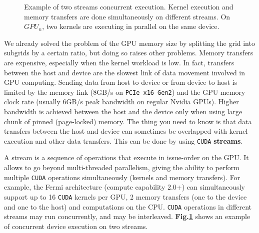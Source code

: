 \documentclass[12pt,journal,compsoc]{IEEEtran}
\begin{document}
\begin{figure}[!ht]
\centering
{}
\caption{Example of two streams concurrent execution. Kernel execution and memory transfers are done simultaneously on different streams. On $GPU_n$, two kernels are executing in parallel on the same device.}
\label{basic_streams}
\end{figure}


We already solved the problem of the GPU memory size by splitting the grid into subgrids by a certain ratio, but doing so raises other problems.
Memory transfers are expensive, especially when the kernel workload is low.
In fact, transfers between the host and device are the slowest link of data movement involved in GPU computing.
Sending data from host to device or from device to host is limited by the memory link (8GB/s on \texttt{PCIe x16 Gen2}) and the GPU memory clock rate (usually 6GB/s peak bandwidth on regular Nvidia GPUs).
Higher bandwidth is achieved between the host and the device only when using large chunk of pinned (page-locked) memory.
The thing you need to know is that data transfers between the host and device can sometimes be overlapped with kernel execution and other data transfers.
This can be done by using \texttt{CUDA} \textbf{streams}.\par
A stream is a sequence of operations that execute in issue-order on the GPU.
It allows to go beyond multi-threaded parallelism, giving the ability to perform multiple \texttt{CUDA} operations simultaneously (kernels and memory transfers).
For example, the Fermi architecture (compute capability 2.0+) can simultaneously support up to 16 \texttt{CUDA} kernels per GPU, 2 memory transfers (one to the device and one to the host) and computations on the CPU.
\texttt{CUDA} operations in different streams may run concurrently, and may be interleaved. \textbf{Fig.\ref{basic_streams}} shows an example of concurrent device execution on two streams.
\end{document}
